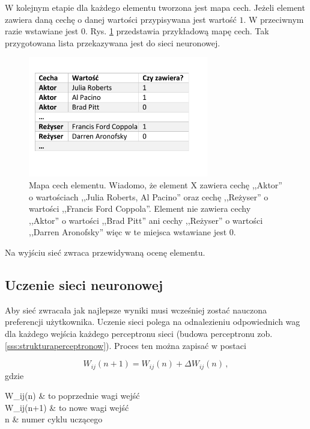 \documentclass[twoside]{iisthesis}
\begin{document}
		 W kolejnym etapie dla każdego elementu tworzona jest mapa cech. Jeżeli element zawiera daną cechę o danej wartości przypisywana jest wartość $1$. W przeciwnym razie wstawiane jest $0$. Rys. \ref{fig:mapacech} przedstawia przykładową mapę cech. Tak przygotowana lista przekazywana jest do sieci neuronowej. 
		 
		 \begin{figure}%
		 	\centering
		 	\includegraphics[width=0.7\textwidth]{mapacech}
		 	\caption{Mapa cech elementu. Wiadomo, że element X zawiera cechę ,,Aktor'' o wartościach ,,Julia Roberts, Al Pacino'' oraz cechę ,,Reżyser'' o wartości ,,Francis Ford Coppola''. Element nie zawiera cechy ,,Aktor'' o wartości ,,Brad Pitt'' ani cechy ,,Reżyser'' o wartości ,,Darren Aronofsky'' więc w te miejsca wstawiane jest $0$.}
		 	\label{fig:mapacech}
		 \end{figure}
		 
		 Na wyjściu sieć zwraca przewidywaną ocenę elementu.
		 		 
		 
		 \subsection{Uczenie sieci neuronowej}
		 \label{ss:uczeniesiecineuronowej}
		 
		 Aby sieć zwracała jak najlepsze wyniki musi wcześniej zostać nauczona preferencji użytkownika. Uczenie sieci polega na odnalezieniu odpowiednich wag dla każdego wejścia każdego perceptronu sieci (budowa perceptronu zob. \ref{sss:strukturaperceptronow}). Proces ten można zapisać w postaci
		 
		 \begin{equation}
		 \label{eq:weightadaptation}
		 W_{ij}(n+1) = W_{ij}(n) + \Delta W_{ij}(n) 
		 \,,
		 \end{equation}		 		 
		 gdzie
		 
		 \begin{conditions*}
		 	W_{ij}(n) & to poprzednie wagi wejść \\
		 	W_{ij}(n+1) & to nowe wagi wejść \\
		 	n & numer cyklu uczącego 
		 \end{conditions*} 
		 
\end{document}
